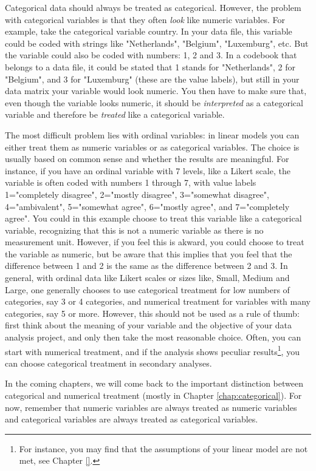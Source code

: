 \documentclass[]{book}\usepackage[]{graphicx}\usepackage[]{color}
\begin{document}
Categorical data should always be treated as categorical. However, the problem with categorical variables is that they often \textit{look} like numeric variables. For example, take the categorical variable country. In your data file, this variable could be coded with strings like "Netherlands", "Belgium", "Luxemburg", etc. But the variable could also be coded with numbers: 1, 2 and 3. In a codebook that belongs to a data file, it could be stated that 1 stands for "Netherlands", 2 for "Belgium", and 3 for "Luxemburg" (these are the value labels), but still in your data matrix your variable would look numeric. You then have to make sure that, even though the variable looks numeric, it should be \textit{interpreted} as a categorical variable and therefore be \textit{treated} like a categorical variable.

The most difficult problem lies with ordinal variables: in linear models you can either treat them as numeric variables or as categorical variables. The choice is usually based on common sense and whether the results are meaningful. For instance, if you have an ordinal variable with 7 levels, like a Likert scale, the variable is often coded with numbers 1 through 7, with value labels 1="completely disagree", 2="mostly disagree", 3="somewhat disagree", 4="ambivalent", 5="somewhat agree", 6="mostly agree", and 7="completely agree". You could in this example choose to treat this variable like a categorical variable, recognizing that this is not a numeric variable as there is no measurement unit. However, if you feel this is akward, you could choose to treat the variable as numeric, but be aware that this implies that you feel that the difference between 1 and 2 is the same as the difference between 2 and 3. In general, with ordinal data like Likert scales or sizes like, Small, Medium and Large, one generally chooses to use categorical treatment for low numbers of categories, say 3 or 4 categories, and numerical treatment for variables with many categories, say 5 or more. However, this should not be used as a rule of thumb: first think about the meaning of your variable and the objective of your data analysis project, and only then take the most reasonable choice. Often, you can start with numerical treatment, and if the analysis shows peculiar results\footnote{For instance, you may find that the assumptions of your linear model are not met, see Chapter \ref{}.}, you can choose categorical treatment in secondary analyses.

In the coming chapters, we will come back to the important distinction between categorical and numerical treatment (mostly in Chapter \ref{chap:categorical}). For now, remember that numeric variables are always treated as numeric variables and categorical variables are always treated as categorical variables.
\end{document}

